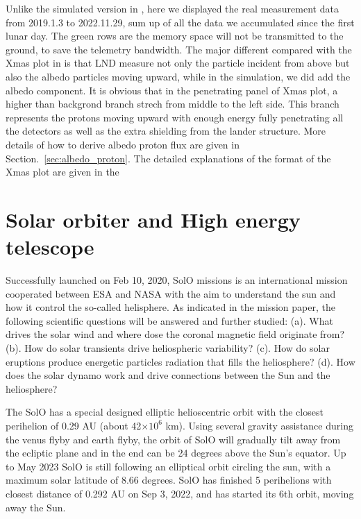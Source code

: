 Unlike the simulated version in \citep{Wimmer2020SSRv}, here we displayed the real measurement data from 2019.1.3 to 2022.11.29, sum up of all the data we accumulated since the first lunar day. The green rows are the memory space will not be transmitted to the ground, to save the telemetry bandwidth. The major different compared with the Xmas plot in \citep{Wimmer2020SSRv} is that LND measure not only the particle incident from above but also the albedo particles moving upward, while in the simulation, we did add the albedo component. It is obvious that in the penetrating panel of Xmas plot,  a higher than backgrond branch strech from middle to the left side. This branch represents the protons moving upward with enough energy fully penetrating all the detectors as well as the extra shielding from the lander structure. More details of how to derive albedo proton flux are given in Section.~\ref{sec:albedo_proton}.
The detailed explanations of the format of the Xmas plot are given in the \citep{Wimmer2020SSRv}


\section{Solar orbiter and High energy telescope}

Successfully launched on Feb 10, 2020, \ac{SolO} missions \citet{Mueller-2020-SolO} is an international mission cooperated between \ac{ESA} and \ac{NASA} with the aim to understand the sun and how it control the so-called helisphere. As indicated in the mission paper, the following scientific questions will be answered and further studied: (a). What drives the solar wind and where dose the coronal magnetic field originate from? (b). How do solar transients drive heliospheric variability? (c). How do solar eruptions produce energetic particles radiation that fills the heliosphere? (d). How does the solar dynamo work and drive connections between the Sun and the heliosphere?


The \ac{SolO} has a special designed elliptic helioscentric orbit with the closest perihelion of 0.29 AU (about 42$\times10^6$ km). Using several gravity assistance during the venus flyby and earth flyby, the orbit of \ac{SolO} will gradually tilt away from the ecliptic plane and in the end can be 24 degrees above the Sun's equator. Up to May 2023 \ac{SolO} is still following an elliptical orbit circling the sun, with a maximum solar latitude of 8.66 degrees. \ac{SolO} has finished 5 perihelions with closest distance of 0.292 AU on Sep 3, 2022, and has started its 6th orbit, moving away the Sun. 

